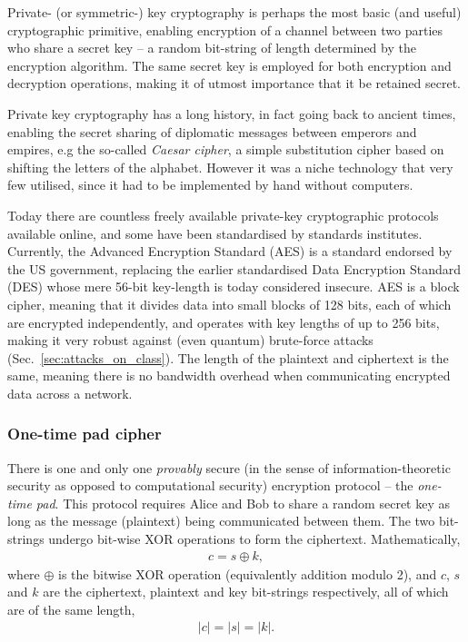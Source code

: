 Private- (or symmetric-) key cryptography is perhaps the most basic (and useful) cryptographic primitive, enabling encryption of a channel between two parties who share a secret key -- a random bit-string of length determined by the encryption algorithm. The same secret key is employed for both encryption and decryption operations, making it of utmost importance that it be retained secret.

Private key cryptography has a long history, in fact going back to ancient times, enabling the secret sharing of diplomatic messages between emperors and empires, e.g the so-called \textit{Caesar cipher}, a simple substitution cipher based on shifting the letters of the alphabet. However it was a niche technology that very few utilised, since it had to be implemented by hand without computers.

Today there are countless freely available private-key cryptographic protocols available online, and some have been standardised by standards institutes. Currently, the Advanced Encryption Standard (AES) is a standard endorsed by the US government, replacing the earlier standardised Data Encryption Standard (DES) whose mere 56-bit key-length is today considered insecure. AES is a block cipher, meaning that it divides data into small blocks of 128 bits, each of which are encrypted independently, and operates with key lengths of up to 256 bits, making it very robust against (even quantum) brute-force attacks (Sec.~\ref{sec:attacks_on_class}). The length of the plaintext and ciphertext is the same, meaning there is no bandwidth overhead when communicating encrypted data across a network.


%
%

\subsubsection{One-time pad cipher}

There is one and only one \textit{provably} secure (in the sense of information-theoretic security as opposed to computational security) encryption protocol -- the \textit{one-time pad}. This protocol requires Alice and Bob to share a random secret key as long as the message (plaintext) being communicated between them. The two bit-strings undergo bit-wise XOR operations to form the ciphertext. Mathematically,
\begin{align}
c = s \oplus k,
\end{align}
where $\oplus$ is the bitwise XOR operation (equivalently addition modulo 2), and $c$, $s$ and $k$ are the ciphertext, plaintext and key bit-strings respectively, all of which are of the same length,
\begin{align}
	|c|=|s|=|k|.
\end{align}

